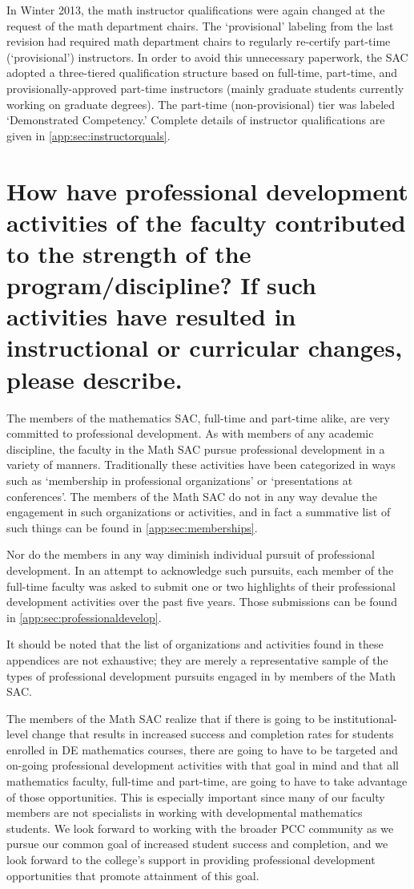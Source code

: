 In Winter 2013, the math instructor qualifications were again changed at the
request of the math department chairs.  The `provisional' labeling
from the last revision had required math department chairs to regularly
re-certify part-time (`provisional') instructors.  In order to avoid this
unnecessary paperwork, the SAC adopted a three-tiered qualification structure
based on full-time, part-time, and provisionally-approved part-time instructors
(mainly graduate students currently working on graduate degrees).  The
part-time (non-provisional) tier was labeled `Demonstrated Competency.'
Complete details of instructor qualifications are given in \vref{app:sec:instructorquals}.


\section[Professional development activities]{How have professional development
 activities of the faculty contributed to the strength of the
 program/discipline? If such activities have resulted in instructional or
curricular changes, please describe.}

The members of the mathematics SAC, full-time and part-time alike, are very
committed to professional development.  As with members of any academic
discipline, the faculty in the Math SAC pursue professional development in a
variety of manners.  Traditionally these activities have been categorized in
ways such as `membership in professional organizations' or `presentations at
conferences'.  The members of the Math SAC do not in any way devalue the
engagement in such organizations or activities, and in fact a summative list of
such things can be found in \vref{app:sec:memberships}.

Nor do the members in any way diminish individual pursuit of professional
development.  In an attempt to acknowledge such pursuits, each member of the
full-time faculty was asked to submit one or two highlights of their
professional development activities over the past five years.  Those
submissions can be found in \vref{app:sec:professionaldevelop}.

It should be noted that the list of organizations and activities found in these
appendices are not exhaustive; they are merely a representative sample of
the types of professional development pursuits engaged in by members of the
Math SAC.

The members of the Math SAC realize that if there is going to be
institutional-level change that results in increased success and completion
rates for students enrolled in DE mathematics courses, there are going to have
to be targeted and on-going professional development activities with that goal
in mind and that all mathematics faculty, full-time and part-time, are going to
have to take advantage of those opportunities.  This is especially important
since many of our faculty members are not specialists in working with
developmental mathematics students. We look forward to working with the broader
PCC community as we pursue our common goal of increased student success and
completion, and we look forward to the college's support in providing
professional development opportunities that promote attainment of this goal.

